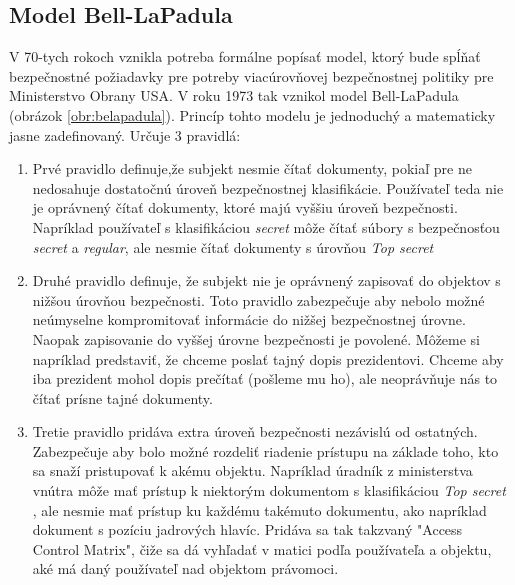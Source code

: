 \subsection{Model Bell-LaPadula} 
V 70-tych rokoch vznikla potreba formálne popísať model, ktorý bude spĺňať bezpečnostné požiadavky pre potreby viacúrovňovej bezpečnostnej politiky pre Ministerstvo Obrany USA.
V roku 1973 tak vznikol model Bell-LaPadula \cite{bell-lapadula} (obrázok \ref{obr:belapadula}). Princíp tohto modelu je jednoduchý  a matematicky jasne zadefinovaný. Určuje 3 pravidlá: 
\begin{enumerate}
	\item Prvé pravidlo definuje,že subjekt nesmie čítať dokumenty, pokiaľ pre ne nedosahuje dostatočnú úroveň bezpečnostnej klasifikácie. Používateľ teda nie je oprávnený čítať dokumenty, ktoré majú vyššiu úroveň bezpečnosti. Napríklad používateľ s klasifikáciou  \emph{secret} môže čítať súbory s bezpečnosťou \emph{secret} a  \emph{regular}, ale nesmie čítať dokumenty s úrovňou  \emph{Top secret}
	\item Druhé pravidlo definuje, že subjekt nie je oprávnený zapisovať do objektov s nižšou úrovňou bezpečnosti. Toto pravidlo zabezpečuje aby nebolo možné neúmyselne kompromitovať informácie do nižšej bezpečnostnej úrovne. Naopak zapisovanie do vyššej úrovne bezpečnosti je povolené. Môžeme si napríklad predstaviť, že chceme poslať tajný dopis prezidentovi. Chceme aby iba prezident mohol dopis prečítať (pošleme mu ho), ale neoprávňuje nás to čítať prísne tajné dokumenty.
	\item Tretie pravidlo pridáva extra úroveň bezpečnosti nezávislú od ostatných. Zabezpečuje aby bolo možné rozdeliť riadenie prístupu na základe toho, kto sa snaží pristupovať k akému objektu. Napríklad úradník z ministerstva vnútra môže mať prístup k niektorým dokumentom s klasifikáciou \emph{Top secret} , ale nesmie mať prístup ku každému takémuto dokumentu, ako napríklad dokument s pozíciu jadrových hlavíc. Pridáva sa tak  takzvaný "Access Control Matrix", čiže sa dá vyhľadať v matici podľa používateľa a objektu, aké má daný používateľ nad objektom právomoci.
\end{enumerate}

